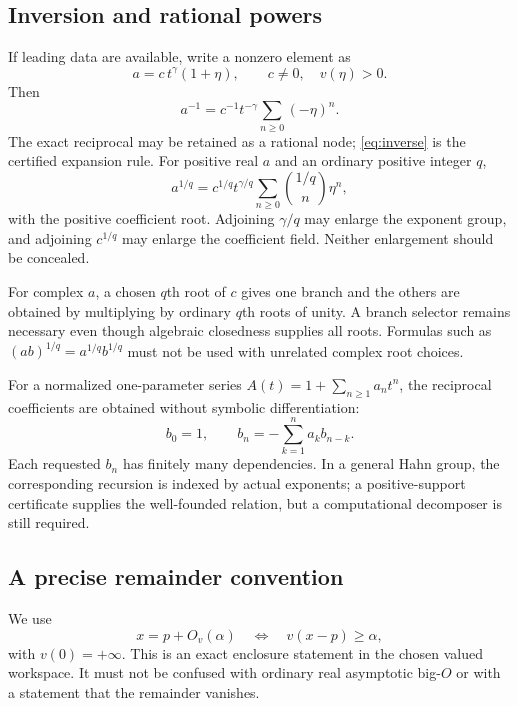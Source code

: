 \documentclass[11pt,letterpaper]{article}
\theoremstyle{definition}
\newcommand{\Ov}[1]{O_v(#1)}
\numberwithin{equation}{section}
\begin{document}
\subsection{Inversion and rational powers}
If leading data are available, write a nonzero element as
\begin{equation}\label{eq:unit}
 a=c\,t^\gamma(1+\eta),\qquad c\ne0,\quad v(\eta)>0.
\end{equation}
Then
\begin{equation}\label{eq:inverse}
 a^{-1}=c^{-1}t^{-\gamma}\sum_{n\ge0}(-\eta)^n.
\end{equation}
The exact reciprocal may be retained as a rational node; \eqref{eq:inverse} is the certified expansion rule. For positive real $a$ and an ordinary positive integer $q$,
\begin{equation}\label{eq:rootbinomial}
 a^{1/q}=c^{1/q}t^{\gamma/q}
       \sum_{n\ge0}\binom{1/q}{n}\eta^n,
\end{equation}
with the positive coefficient root. Adjoining $\gamma/q$ may enlarge the exponent group, and adjoining $c^{1/q}$ may enlarge the coefficient field. Neither enlargement should be concealed.

For complex $a$, a chosen $q$th root of $c$ gives one branch and the others are obtained by multiplying by ordinary $q$th roots of unity. A branch selector remains necessary even though algebraic closedness supplies all roots. Formulas such as $(ab)^{1/q}=a^{1/q}b^{1/q}$ must not be used with unrelated complex root choices.

For a normalized one-parameter series $A(t)=1+\sum_{n\ge1}a_nt^n$, the reciprocal coefficients are obtained without symbolic differentiation:
\[
 b_0=1,\qquad b_n=-\sum_{k=1}^n a_kb_{n-k}.
\]
Each requested $b_n$ has finitely many dependencies. In a general Hahn group, the corresponding recursion is indexed by actual exponents; a positive-support certificate supplies the well-founded relation, but a computational decomposer is still required.

\subsection{A precise remainder convention}
We use
\[
 x=p+\Ov{\alpha}\quad\Longleftrightarrow\quad v(x-p)\ge\alpha,
\]
with $v(0)=+\infty$. This is an exact enclosure statement in the chosen valued workspace. It must not be confused with ordinary real asymptotic big-$O$ or with a statement that the remainder vanishes.
\end{document}
